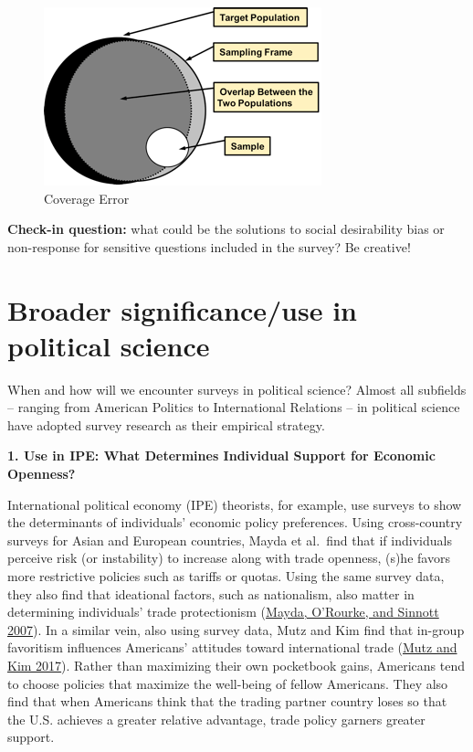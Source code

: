 \documentclass{book}
\begin{document}
\begin{figure}
\hypertarget{fig:coverage_error}{%
\centering
\includegraphics{images/surveys/coverage_error.png}
\caption{Coverage Error}\label{fig:coverage_error}
}
\end{figure}

\textbf{Check-in question:} what could be the solutions to social desirability
bias or non-response for sensitive questions included in the survey? Be
creative!

\hypertarget{broader-significanceuse-in-political-science-2}{%
\section{Broader significance/use in political
science}\label{broader-significanceuse-in-political-science-2}}

When and how will we encounter surveys in political science? Almost all
subfields -- ranging from American Politics to International Relations -- in
political science have adopted survey research as their empirical strategy.

\textbf{1. Use in IPE: What Determines Individual Support for Economic
Openness?}

International political economy (IPE) theorists, for example, use surveys to
show the determinants of individuals' economic policy preferences. Using
cross-country surveys for Asian and European countries, Mayda et al.~find that
if individuals perceive risk (or instability) to increase along with trade
openness, (s)he favors more restrictive policies such as tariffs or quotas.
Using the same survey data, they also find that ideational factors, such as
nationalism, also matter in determining individuals' trade protectionism
(\protect\hyperlink{ref-mayda2007risk}{Mayda, O'Rourke, and Sinnott 2007}). In
a similar vein, also using survey data, Mutz and Kim find that in-group
favoritism influences Americans' attitudes toward international trade
(\protect\hyperlink{ref-mutz2017impact}{Mutz and Kim 2017}). Rather than
maximizing their own pocketbook gains, Americans tend to choose policies that
maximize the well-being of fellow Americans. They also find that when
Americans think that the trading partner country loses so that the U.S.
achieves a greater relative advantage, trade policy garners greater support.
\end{document}
